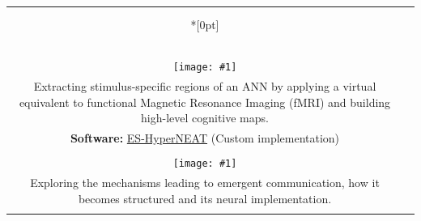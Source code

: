 \documentclass[a4paper,12pt,final]{article}
\makeatletter
\newcommand{\prettyuline}[1]{%
 \uline{\phantom{#1}}%
 \llap{\contour{white}{#1}}%
}
\newlength\lwidth
\newlength\rwidth
\newlength\titlewidth
\newlength\titleoffset
\newenvironment{sect}[2][{\\*[0pt]}]{%
 \def\title{\Large\prettyuline{\texttt{\textbf{#2}}}}%
 \setlength{\titlewidth}{\widthof{\title}}%
 \setlength{\titleoffset}{\maxof{0pt}{\lwidth-\titlewidth*\real{0.5}}}%
%  
 \begin{longtable}{@{}c|c@{}}%
  \multicolumn{2}{l}{\hspace{\titleoffset}\title}\vspace{-2.9pt}\\*#1%
}{%
 \end{longtable}%
}%
\def\dbgrule{}
\newcommand{\itm}[3]{%
\dbgrule%
 \makecell[t{p{\lwidth}}]{%
  \raggedleft%
  \ifx\hfuzz#1\hfuzz\else%
   \textbf{#1}%
   \ifx\hfuzz#2\hfuzz\else\\\fi%
  \fi%
  #2%
 } & \makecell[t{p{\rwidth}}]{#3} \\
\dbgrule
}
\makeatother
\begin{document}
\newcommand{\ritm}[5]{%
 \itm{}{%
  \begin{minipage}[t]{\lwidth}%
   \vspace{0pt}%
   \raggedleft
   \texttt{[image: \#1]}%
  \end{minipage}%
 }{%
  \begin{minipage}[t]{\rwidth}%
   \vspace{0pt}\small%
   \cite{#4} \textsc{\En{#2}\Fr{#3}} \\%
   #5%
  \end{minipage}%
 }
}
\newcommand{\sref}[3][Software]{\textbf{#1:} \href{#2}{#3}}
\begin{sect}{Research}
 \itm{Synopsis}{}{%
  \small My main interests revolve around autonomous artificial life forms: from the design of efficient morphologies to the emergence of high-level control schemes and the evolutionary constraints that favor both.
  Recently I am mostly focused on Artificial Neural Networks (ANN) through NeuroEvolution and Reinforcement Learning, notably in the context of Interactive Evolutionary Robotics.
 }
 \\
 
 \itm{Artificial Neural Networks}{}{
  Studying the emergence of various ``cognitive'' capabilities in virtual robots, controlled by a spontaneously differentiated neural network, in response to biologically plausible stimuli.
 }
 \ritm{ann_vfmri_colored}{Virtual fMRI}{IRMf virtuelle}{GodinDubois2021a,GodinDubois2023,GodinDubois2024b}{
  Extracting stimulus-specific regions of an ANN by applying a virtual equivalent to functional Magnetic Resonance Imaging (fMRI) and building high-level cognitive maps. \\
  \sref{https://github.com/kgd-al/ES-HyperNEAT}{ES-HyperNEAT} (Custom implementation)
 }
 \ritm{communication}{Communication}{Communication}{GodinDubois2021b,GodinDubois2022a}{
  Exploring the mechanisms leading to emergent communication, how it becomes structured and its neural implementation.
 }
 \\[.5em]


\end{sect}
\end{document}
